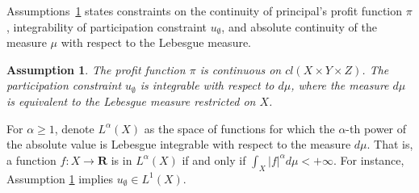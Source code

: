 \documentclass[a4paper, 11pt]{amsart}
\numberwithin{equation}{section}
\theoremstyle{plain}
\newtheorem{assumption}{Assumption}
\theoremstyle{definition}
\theoremstyle{remark}
\newcommand{\R}{\mathbf{R}}
\begin{document}
Assumptions~\ref{assmp:Pi1} states constraints on the continuity of principal's profit function $\pi$, integrability of participation constraint $u_{\emptyset}$, and absolute continuity of the measure $\mu$ with respect to the Lebesgue measure. 


\begin{assumption}\label{assmp:Pi1}
	The profit function $\pi$ is continuous on $cl(X\times Y\times Z)$. The participation constraint $u_{\emptyset}$ is integrable with respect to $d \mu$, where the measure $d \mu$ is equivalent to the Lebesgue measure restricted on $X$.%
\end{assumption}





For $\alpha \ge 1$, denote $L^{\alpha}(X)$ as the space of functions for which the $\alpha$-th power of the absolute value is Lebesgue integrable {with respect to the measure $d \mu$}. That is, a function $f: X\longrightarrow \R$ is in $L^{\alpha}(X)$ if and only if $\int_{X} |f|^{\alpha} d\mu <+\infty$. For instance, Assumption \ref{assmp:Pi1} implies $u_{\emptyset}\in L^{1}(X)$.\medskip


\end{document}
